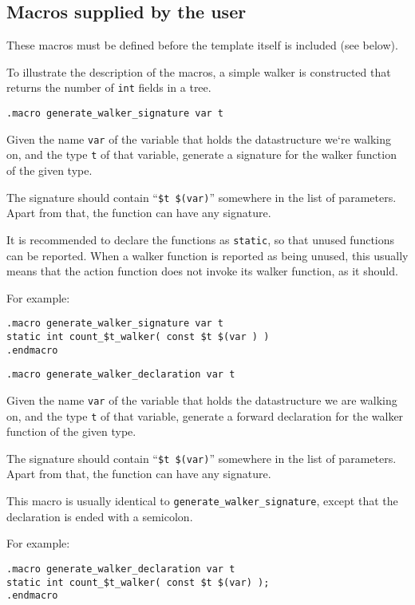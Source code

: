 \subsection{Macros supplied by the user}
These macros must be defined before the template itself is included
(see below).
\par
To illustrate the description of the macros, a simple walker is
constructed that returns the number of {\tt int} fields in a tree.
\begin{verbatim}
.macro generate_walker_signature var t
\end{verbatim}
\begin{desc}
Given the name \verb'var' of the variable that holds the datastructure
we`re walking on, and the type \verb't' of that variable, generate a
signature for the walker function of the given type.
\par
The signature should contain ``\verb'$t $(var)''' somewhere in the list
of parameters. Apart from that, the function can have any signature.
\par
It is recommended to declare the functions as \verb'static', so that
unused functions can be reported. When a walker function is reported
as being unused, this usually means that the
action function does not invoke its walker function, as it should.
\par
For example:
\begin{verbatim}
.macro generate_walker_signature var t
static int count_$t_walker( const $t $(var ) )
.endmacro
\end{verbatim}
\end{desc}
\begin{verbatim}
.macro generate_walker_declaration var t
\end{verbatim}
\begin{desc}
Given the name \verb'var' of the variable that holds the datastructure
we are walking on, and the type \verb't' of that variable, generate a forward
declaration for the walker function of the given type.
\par
The signature should contain ``\verb'$t $(var)''' somewhere in the list
of parameters. Apart from that, the function can have any signature.
\par
This macro is usually identical to \verb'generate_walker_signature',
except that the declaration is ended with a semicolon.
\par
For example:
\begin{verbatim}
.macro generate_walker_declaration var t
static int count_$t_walker( const $t $(var) );
.endmacro
\end{verbatim}
\end{desc}
